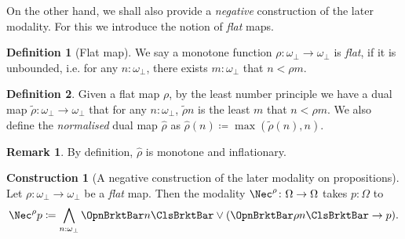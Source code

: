 \documentclass[a4paper,10pt]{amsart}
\newtheorem{proposition}{Proposition}[section]
\theoremstyle{definition}
\newtheorem{definition}{Definition}[section]
\newtheorem{remark}{Remark}[section]
\newtheorem{construction}{Construction}[section]
\newcommand{\pf}[1]{\widehat{#1}}
\newcommand{\qsi}[1]{\widetilde{#1}}
\newcommand{\fa}[2]{\forall #1 \!:\! #2.\ }
\newcommand{\ex}[2]{\exists #1 \!:\! #2.\ }
\newcommand{\ass}[1]{\OpnBrktBar#1\ClsBrktBar}
\newcommand{\ovob}{\omega_\bot}
\newcommand{\bbx}{\Nec}
\newcommand{\Prop}{\Omega}
\begin{document}
On the other hand, we shall also provide a \emph{negative} construction of the later modality. For this we introduce the notion of \emph{flat} maps.


\begin{definition}[Flat map]\label{flat}
  We say a monotone function $\rho \colon \ovob \to \ovob$ is \emph{flat}, if it is unbounded, i.e. for any $n:\ovob$, there exists $m:\ovob$ that $n < \rho m$. 
\end{definition}

\begin{definition}\label{dualmapofflat}
  Given a flat map $\rho$, by the least number principle we have a dual map $\qsi\rho \colon \ovob \to \ovob$ that for any $n:\ovob$, $\qsi\rho n$ is the least $m$ that $n < \rho m$. We also define the \emph{normalised} dual map $\pf\rho$ as $\pf\rho(n) \coloneq \max(\qsi\rho(n),n)$.
\end{definition}

\begin{remark}
  By definition, $\pf\rho$ is monotone and inflationary.
\end{remark}

\begin{construction}[A negative construction of the later modality on propositions]\label{consnegprop}
  Let $\rho \colon \ovob \to \ovob$ be a \emph{flat} map.
  Then the modality $\bbx^\rho \colon \Prop \to \Prop$ takes $p:\Prop$ to
  \[ \bbx^\rho p \coloneq \bigwedge_{n:\ovob} \ass{n} \vee (\ass{\rho n} \to p). \]
\end{construction}
\end{document}

